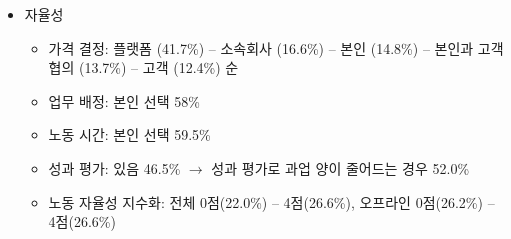 \begin{itemize}
\begin{itemize}
	\item 자율성
		\begin{itemize}
		\item 가격 결정: 플랫폼 (41.7\%) -- 소속회사 (16.6\%) -- 본인 (14.8\%) -- 본인과 고객 협의 (13.7\%) -- 고객 (12.4\%) 순
		\item 업무 배정: 본인 선택 58\%
		\item 노동 시간: 본인 선택 59.5\% 
		\item 성과 평가: 있음 46.5\% $\rightarrow$ 성과 평가로 과업 양이 줄어드는 경우 52.0\%
		\item 노동 자율성 지수화: 전체 0점(22.0\%) -- 4점(26.6\%), 오프라인 0점(26.2\%) -- 4점(26.6\%)
		\end{itemize}	
	\end{itemize}
\end{itemize}




